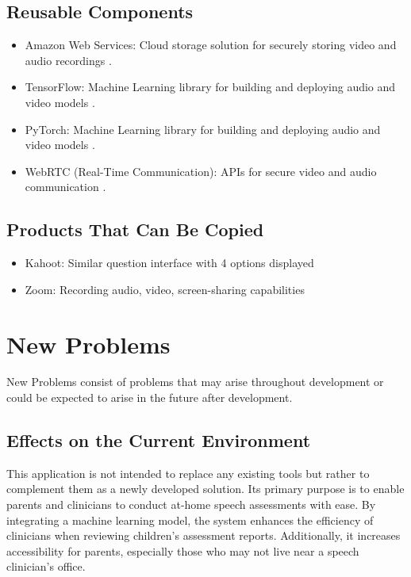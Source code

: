 \documentclass[12pt]{article}
\begin{document}
\subsection{Reusable Components}
\begin{itemize}
  \item Amazon Web Services: Cloud storage solution for securely storing video and audio recordings \cite{aws}. 
  \item TensorFlow: Machine Learning library for building and deploying audio and video models \cite{tensorflow}.
  \item PyTorch: Machine Learning library for building and deploying audio and video models \cite{pytorch}.
  \item WebRTC (Real-Time Communication): APIs for secure video and audio communication \cite{webrtc}.
\end{itemize}
\subsection{Products That Can Be Copied}
\begin{itemize}
  \item Kahoot: Similar question interface with 4 options displayed \cite{kahoot}
  \item Zoom: Recording audio, video, screen-sharing capabilities \cite{zoom}
\end{itemize}

\newpage

\section{New Problems}
\hspace{2em}New Problems consist of problems that may arise throughout development or could be expected to arise in the future after development.
\subsection{Effects on the Current Environment}
\hspace{2em}This application is not intended to replace any existing tools but rather to complement 
them as a newly developed solution. Its primary purpose is to enable parents and clinicians to 
conduct at-home speech assessments with ease. By integrating a machine learning model, the system 
enhances the efficiency of clinicians when reviewing children's assessment reports. 
Additionally, it increases accessibility for parents, especially those who may not live near a speech clinician's office.
\end{document}
